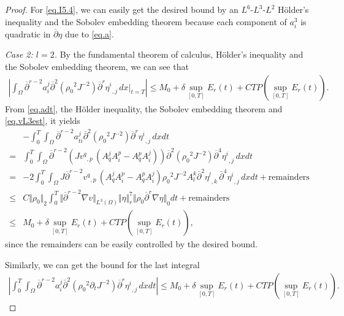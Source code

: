 \documentclass[12pt,twoside,reqno]{amsart}
\numberwithin{equation}{section}
\theoremstyle{definition}
\theoremstyle{remark}
\begin{document}
\begin{proof}
For \eqref{eq.I5.4}, we can easily get the desired bound by an $L^6$-$L^3$-$L^2$ H\"older's inequality and the Sobolev embedding theorem because each component of $a_i^3$ is quadratic in ${\overline{\partial}} \eta$ due to \eqref{eq.a}.

\emph{Case 2: $l=2$.} By the fundamental theorem of calculus, H\"older's inequality and the Sobolev embedding theorem, we can see that
\begin{align*}
  {\left\vert{\int_\Omega {\overline{\partial}}^{r-2} a^j_i {\overline{\partial}}^2({\rho_0}^2 J^{-2}){\overline{\partial}}^r{{{\eta^i}}_{,{j}}\,}dx\Big|_{t=T}}\right\vert}{\leqslant} M_0+\delta\sup_{[0,T]}E_r(t)+CTP(\sup_{[0,T]}E_r(t)).
\end{align*}
From \eqref{eq.adt}, the H\"older inequality, the Sobolev embedding theorem and \eqref{eq.vL3est}, it yields
\begin{align*}
  &-{\int_0^T\!\!\!\!\int_\Omega }  {\overline{\partial}}^{r-2} a^j_{ti} {\overline{\partial}}^2({\rho_0}^2 J^{-2}){\overline{\partial}}^r{{{\eta^i}}_{,{j}}\,}dxdt\\
  =&{\int_0^T\!\!\!\!\int_\Omega } {\overline{\partial}}^{r-2}\left(J{{{v^q}}_{,{p}}\,}(A^j_qA^p_i- A^p_qA^j_i)\right){\overline{\partial}}^2({\rho_0}^2  J^{-2}){\overline{\partial}}^4{{{\eta^i}}_{,{j}}\,}dxdt\\
  =&-2{\int_0^T\!\!\!\!\int_\Omega }  J{\overline{\partial}}^{r-2}{{{v^q}}_{,{p}}\,}(A^j_qA^p_i -A^p_qA^j_i){\rho_0}^2  J^{-2}A^k_l{{{{\overline{\partial}}^2\eta^l}}_{,{k}}\,}{\overline{\partial}}^4{{{\eta^i}}_{,{j}}\,}dxdt+\text{remainders}\\
  {\leqslant} &C{\Vert{\rho_0}\Vert}_2\int_0^T{\Vert{{\overline{\partial}}^{r-2}{\nabla} v}\Vert}_{L^3(\Omega)}{\Vert{\eta}\Vert}_r^7 {\Vert{{\rho_0} {\overline{\partial}}^r{\nabla}\eta}\Vert}_0dt+\text{remainders}\\
  {\leqslant} &M_0+\delta\sup_{[0,T]}E_r(t)+CTP(\sup_{[0,T]}E_r(t)),
\end{align*}
since the remainders can be easily controlled by the desired bound.

Similarly, we can get the bound for the last integral
\begin{align*}
  {\left\vert{{\int_0^T\!\!\!\!\int_\Omega }  {\overline{\partial}}^{r-2} a^j_{i} {\overline{\partial}}^2({\rho_0}^2 {\partial}_tJ^{-2}){\overline{\partial}}^r{{{\eta^i}}_{,{j}}\,}dxdt}\right\vert}{\leqslant} M_0+\delta\sup_{[0,T]}E_r(t)+CTP(\sup_{[0,T]}E_r(t)).
\end{align*}


\end{proof}
\end{document}
